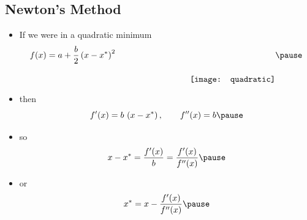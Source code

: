 
\begin{slide}
\section{Newton's Method}

\begin{PauseHighLight}

\begin{itemize}
\item If we were in a quadratic minimum
  \vspace{-2cm}
  \begin{displaymath}
    f(x) = a + \frac{b}{2} \left(x-x^*\right)^2 \hspace{3cm}
    \raisebox{-1cm}{\texttt{[image: quadratic]}}
 \pause
  \end{displaymath}
\item then
  \begin{displaymath}
    f'(x) = b\,\left(x-x^*\right), \hspace{2em}
    f''(x) = b\pause
  \end{displaymath}
\item so
  \begin{displaymath}
    x-x^* = \frac{f'(x)}{b} = \frac{f'(x)}{f''(x)}\pause
  \end{displaymath}
\item or
  \begin{displaymath}
    x^* = x - \frac{f'(x)}{f''(x)}\pause
  \end{displaymath}
\end{itemize}

\end{PauseHighLight}
\end{slide}


